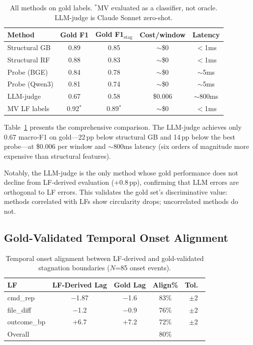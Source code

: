 \documentclass[11pt,a4paper]{article}
\begin{document}
\begin{table}[t]
\centering
\small
\begin{tabular}{lcccc}
\toprule
Method & Gold F1 & Gold F1$_\text{stag}$ & Cost/window & Latency \\
\midrule
Structural GB & 0.89 & 0.85 & $\sim$\$0 & $<$1ms \\
Structural RF & 0.88 & 0.83 & $\sim$\$0 & $<$1ms \\
Probe (BGE) & 0.84 & 0.78 & $\sim$\$0 & $\sim$5ms \\
Probe (Qwen3) & 0.81 & 0.74 & $\sim$\$0 & $\sim$5ms \\
LLM-judge & 0.67 & 0.58 & \$0.006 & $\sim$800ms \\
MV LF labels & 0.92$^*$ & 0.89$^*$ & $\sim$\$0 & $<$1ms \\
\bottomrule
\end{tabular}
\caption{All methods on gold labels. $^*$MV evaluated as a classifier, not oracle. LLM-judge is Claude Sonnet zero-shot.}
\label{tab:all-methods-gold}
\end{table}

Table~\ref{tab:all-methods-gold} presents the comprehensive comparison.
The LLM-judge achieves only 0.67 macro-F1 on gold---22\,pp below structural GB and 14\,pp below the best probe---at \$0.006 per window and $\sim$800ms latency (six orders of magnitude more expensive than structural features).

Notably, the LLM-judge is the only method whose gold performance does not decline from LF-derived evaluation ($+$0.8\,pp), confirming that LLM errors are orthogonal to LF errors.
This validates the gold set's discriminative value: methods correlated with LFs show circularity drops; uncorrelated methods do not.

\subsection{Gold-Validated Temporal Onset Alignment}

\begin{table}[t]
\centering
\small
\begin{tabular}{lcccc}
\toprule
LF & LF-Derived Lag & Gold Lag & Align\% & Tol.\ \\
\midrule
cmd\_rep & $-$1.87 & $-$1.6 & 83\% & $\pm$2 \\
file\_diff & $-$1.2 & $-$0.9 & 76\% & $\pm$2 \\
outcome\_bp & $+$6.7 & $+$7.2 & 72\% & $\pm$2 \\
\midrule
Overall & & & 80\% & \\
\bottomrule
\end{tabular}
\caption{Temporal onset alignment between LF-derived and gold-validated stagnation boundaries ($N$=85 onset events).}
\label{tab:temporal-onset}
\end{table}
\end{document}
